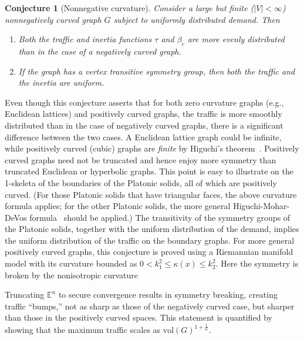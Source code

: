 \documentclass{article}
\newcommand{\vol}{\mathrm{vol}}
\newtheorem{conjecture}{Conjecture}
\begin{document}
\begin{conjecture}[Nonnegative curvature]
Consider a large but finite ($|V|<\infty$) nonnegatively curved graph $G$ subject to uniformly distributed demand. Then
\begin{enumerate} 
\item Both the traffic and inertia functions $\tau$ and $\beta_c$ are more evenly distributed 
than in the case of a negatively curved graph.
\item If the graph has a vertex transitive symmetry group, then both the traffic and the 
inertia are uniform.  
\end{enumerate}
\end{conjecture}
\noindent
Even though this conjecture asserts that for both 
zero curvature graphs (e.g., Euclidean lattices) and positively curved graphs, 
the traffic is more smoothly distributed than in the case of negatively curved graphs, 
there is a significant difference between the two cases. 
A Euclidean lattice graph could be infinite, 
while positively curved (cubic) graphs are {\it finite}
by Higuchi's theorem~\cite{japanese_combinatorial_curvature,positively_curved_graphs,reti_4_combinatorial_curvature,mohar}.  
Positively curved graphs need not be truncated 
and hence enjoy more symmetry than truncated Euclidean or hyperbolic graphs. 
This point is easy to illustrate 
on the 1-skeleta of the boundaries of the Platonic solids, 
all of which are positively curved. 
(For those Platonic solids that have triangular faces, the above curvature formula applies; 
for the other Platonic solids, 
the more general Higuchi-Mohar-DeVos formula~\cite{mohar} should be applied.)   
The transitivity of the symmetry groups of the Platonic solids, 
together with the uniform distribution of the demand, 
implies the uniform distribution of the traffic on the boundary graphs. 
For more general positively curved graphs, 
this conjecture is proved using a Riemannian manifold model 
with its curvature bounded as $0< k_1^2 \leq \kappa(x) \leq k_2^2$. 
Here the symmetry is broken by the nonisotropic curvature

Truncating $\mathbb{E}^n$ to secure convergence results in symmetry breaking, 
creating traffic ``bumps,'' not as sharp as those of the negatively curved case, 
but sharper than those in the positively curved spaces.  
This statement is quantified by showing 
that the maximum traffic scales as $\vol(G)^{1+\frac{1}{n}}$. 
\end{document}
